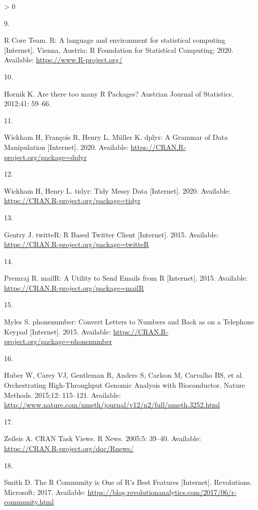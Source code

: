 \documentclass[10pt,letterpaper]{article}
\newlength{\csllabelwidth}
\newlength{\cslhangindent}
\newenvironment{CSLReferences}[3] %
 {%
  \setlength{\parindent}{0pt}
  \ifodd #1 \everypar{\setlength{\hangindent}{\cslhangindent}}\ignorespaces\fi
  \ifnum #2 > 0
  \setlength{\parskip}{#2\baselineskip}
  \fi
 }%
 {}
\newcommand{\CSLLeftMargin}[1]{\parbox[t]{\csllabelwidth}{#1}}
\newcommand{\CSLRightInline}[1]{\parbox[t]{\linewidth - \csllabelwidth}{#1}}
\begin{document}
\begin{CSLReferences}{0}{0}
\leavevmode\hypertarget{ref-Rproject2020}{}%
\CSLLeftMargin{9. }
\CSLRightInline{R Core Team. R: A language and environment for
statistical computing {[}Internet{]}. Vienna, Austria: R Foundation for
Statistical Computing; 2020. Available:
\url{https://www.R-project.org/}}

\leavevmode\hypertarget{ref-hornik2012}{}%
\CSLLeftMargin{10. }
\CSLRightInline{Hornik K. {Are there too many R Packages?} Austrian
Journal of Statistics. 2012;41: 59--66. }

\leavevmode\hypertarget{ref-dplyr}{}%
\CSLLeftMargin{11. }
\CSLRightInline{Wickham H, François R, Henry L, Müller K. {dplyr: A
Grammar of Data Manipulation} {[}Internet{]}. 2020. Available:
\url{https://CRAN.R-project.org/package=dplyr}}

\leavevmode\hypertarget{ref-tidyr}{}%
\CSLLeftMargin{12. }
\CSLRightInline{Wickham H, Henry L. {tidyr: Tidy Messy Data}
{[}Internet{]}. 2020. Available:
\url{https://CRAN.R-project.org/package=tidyr}}

\leavevmode\hypertarget{ref-twitteR}{}%
\CSLLeftMargin{13. }
\CSLRightInline{Gentry J. {twitteR: R Based Twitter Client}
{[}Internet{]}. 2015. Available:
\url{https://CRAN.R-project.org/package=twitteR}}

\leavevmode\hypertarget{ref-mailR}{}%
\CSLLeftMargin{14. }
\CSLRightInline{Premraj R. {mailR: A Utility to Send Emails from R}
{[}Internet{]}. 2015. Available:
\url{https://CRAN.R-project.org/package=mailR}}

\leavevmode\hypertarget{ref-phonenumber}{}%
\CSLLeftMargin{15. }
\CSLRightInline{Myles S. {phonenumber: Convert Letters to Numbers and
Back as on a Telephone Keypad} {[}Internet{]}. 2015. Available:
\url{https://CRAN.R-project.org/package=phonenumber}}

\leavevmode\hypertarget{ref-bioCproject}{}%
\CSLLeftMargin{16. }
\CSLRightInline{Huber W, Carey VJ, Gentleman R, Anders S, Carlson M,
Carvalho BS, et al. {Orchestrating High-Throughput Genomic Analysis with
Bioconductor}. Nature Methods. 2015;12: 115--121. Available:
\url{http://www.nature.com/nmeth/journal/v12/n2/full/nmeth.3252.html}}

\leavevmode\hypertarget{ref-ctv}{}%
\CSLLeftMargin{17. }
\CSLRightInline{Zeileis A. {CRAN Task Views}. R News. 2005;5: 39--40.
Available: \url{https://CRAN.R-project.org/doc/Rnews/}}

\leavevmode\hypertarget{ref-smith2017}{}%
\CSLLeftMargin{18. }
\CSLRightInline{Smith D. {The R Community is One of R's Best Features}
{[}Internet{]}. Revolutions. Microsoft; 2017. Available:
\url{https://blog.revolutionanalytics.com/2017/06/r-community.html}}


\end{CSLReferences}
\end{document}

